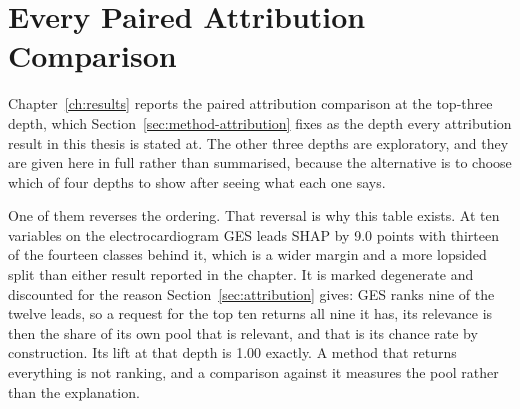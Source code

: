 \section{Every Paired Attribution Comparison}
\label{app:attr-paired-full}

Chapter~\ref{ch:results} reports the paired attribution comparison at the top-three depth, which Section~\ref{sec:method-attribution} fixes as the depth every attribution result in this thesis is stated at. The other three depths are exploratory, and they are given here in full rather than summarised, because the alternative is to choose which of four depths to show after seeing what each one says.

One of them reverses the ordering. That reversal is why this table exists. At ten variables on the electrocardiogram GES leads SHAP by 9.0 points with thirteen of the fourteen classes behind it, which is a wider margin and a more lopsided split than either result reported in the chapter. It is marked degenerate and discounted for the reason Section~\ref{sec:attribution} gives: GES ranks nine of the twelve leads, so a request for the top ten returns all nine it has, its relevance is then the share of its own pool that is relevant, and that is its chance rate by construction. Its lift at that depth is 1.00 exactly. A method that returns everything is not ranking, and a comparison against it measures the pool rather than the explanation.


